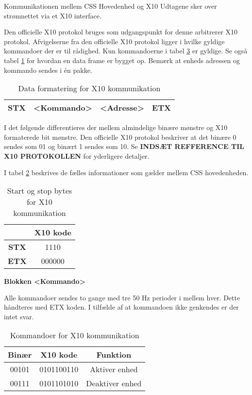 Kommunikationen mellem CSS Hovedenhed og X10 Udtagene sker over strømnettet via et X10 interface.

Den officielle X10 protokol bruges som udgangspunkt for denne arbitrerer X10 protokol.
Afvigelserne fra den officielle X10 protokol ligger i hvilke gyldige kommandoer der er til rådighed. Kun kommandoerne i tabel \ref{tabel:X10Kommandoer} er gyldige. Se også tabel \ref{table:X10DataFormat} for hvordan en data frame er bygget op. Bemærk at   enheds adressen og kommando sendes i én pakke.

\begin{table}[h]
	\caption{Data formatering for X10 kommunikation}
	\centering
	\begin{tabular}{|c|c|c|c|}
		\hline 
		STX & <Kommando> & <Adresse> & ETX \\
		\hline 
	\end{tabular} 
	\label{table:X10DataFormat}
\end{table}

I det følgende differentieres der mellem almindelige binære mønstre og X10 formaterede bit mønstre.
Den officielle X10 protokol beskriver at det binære 0 sendes som 01 og binært 1 sendes som 10. Se \textbf{INDSÆT REFFERENCE TIL X10 PROTOKOLLEN} for yderligere detaljer.

I tabel \ref{table:X10StartStopBytes} beskrives de fælles informationer som gælder mellem CSS hovedenheden.

\begin{table}[h]
	\caption{Start og stop bytes for X10 kommunikation}
	\centering
	\begin{tabular}{|c|c|}
		\hline 
		& \textbf{X10 kode} \\ 
		\hline 
		\textbf{STX} & 1110\\ 
		\hline 
		\textbf{ETX} & 000000 \\ 
		\hline 
	\end{tabular} 
	\label{table:X10StartStopBytes}
\end{table}

\textbf{Blokken <Kommando>}

Alle kommandoer sendes to gange med tre 50 Hz perioder i mellem hver. Dette håndteres med ETX koden.
I tilfælde af at kommandoen ikke genkendes er der intet svar.

\begin{table}[h]
\caption{Kommandoer for X10 kommunikation}
\centering
\begin{tabular}{|c|c|c|}
\hline 
\textbf{Binær} & \textbf{X10 kode} & \textbf{Funktion} \\ 
\hline 
00101 & 0101100110 & Aktiver enhed \\ 
\hline 
00111 & 0101101010 & Deaktiver enhed \\ 
\hline
\end{tabular}
\label{tabel:X10Kommandoer}
\end{table} 

